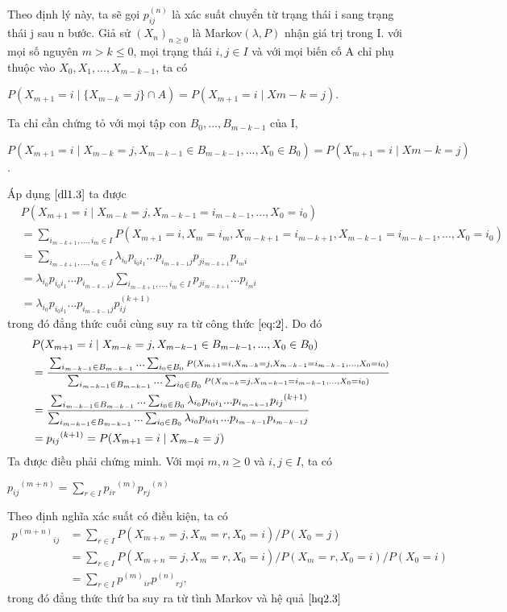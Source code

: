 Theo định lý này, ta sẽ gọi $p_{ij}^{(n)}$ là xác suất chuyển từ trạng thái i sang trạng thái j sau n bước.
\hdl
\hq\label{hq2.3}
Giả sử $(X_n)_{n \geq 0}$ là Markov$(\lambda, P)$ nhận giá trị trong I. với mọi số nguyên $m > k \leq 0$, mọi trạng thái $i, j \in I$ và với mọi biến cố A chỉ phụ thuộc vào $X_0, X_1,...,X_{m-k-1}$, ta có
\begin{center}
$P(X_{m+1}=i \mid \{X_{m-k}=j\}\cap A) = P(X_{m+1}=i \mid X{m-k}=j)$.
\end{center}
\hhq
\cm
Ta chỉ cần chứng tỏ với mọi tập con $B_0,...,B_{m-k-1}$ của I,
\begin{center}
$P(X_{m+1}=i \mid X_{m-k}=j, X_{m-k-1} \in B_{m-k-1}, ...,X_0 \in B_0) = P(X_{m+1}=i \mid X{m-k}=j)$.
\end{center}
Áp dụng $\eqref{dl1.3}$ ta được
\begin{align*} 
&P(X_{m+1}=i \mid X_{m-k}=j, X_{m-k-1}=i_{m-k-1}, ...,X_0 =i_0)\\
&= \sum_{i_{m-k+1},...,i_m \in I}{\scriptstyle P(X_{m+1}=i, X_m=i_m, X_{m-k+1}= i_{m-k+1}, X_{m-k-1}= i_{m-k-1},...,X_0=i_0)}\\
&=\sum_{i_{m-k+1},...,i_m \in I}{\lambda_{i_0}p_{i_0 i_1}...p_{i_{m-k-1}j}p_{ji_{m-k+1}}p_{i_m i}}\\
&=\lambda_{i_0}p_{i_0 i_1}...p_{i_{m-k-1}j} \sum_{i_{m-k+1},...,i_m \in I}{p_{ji_{m-k+1}}...p_{i_m i}}\\
&= \lambda_{i_0}p_{i_0 i_1}...p_{i_{m-k-1}j}{p_{ij}^{(k+1)}}
\end{align*}
trong đó đẳng thức cuối cùng suy ra từ công thức $\eqref{eq:2}$. Do đó
\begin{align*}
&P(X_{m+1}=i \mid X_{m-k}=j, X_{m-k-1} \in B_{m-k-1}, ...,X_0 \in B_0)\\ 
&=\cfrac{\sum_{i_{m-k-1}\in B_{m-k-1}}{...\sum_{i_0 \in B_0}{\scriptstyle P(X_{m+1}=i, X_{m-k}=j, X_{m-k-1}=i_{m-k-1},...,X_0 = i_0)}}}{\sum_{i_{m-k-1}\in B_{m-k-1}}{...\sum_{i_0 \in B_0}{\scriptstyle P(X_{m-k}=j, X_{m-k-1}=i_{m-k-1},...,X_0 = i_0)}}}\\
&=\cfrac{\sum_{i_{m-k-1}\in B_{m-k-1}}{...\sum_{i_0 \in B_0}{\lambda_{i_0}p_{i_0 i_1}...p_{i_{m-k-1}}{p_{ij}}^{(k+1)}}}}{\sum_{i_{m-k-1}\in B_{m-k-1}}{...\sum_{i_0 \in B_0}{\lambda_{i_0}p_{i_0 i_1}...p_{i_{m-k-1}}{p_{i_{m-k-1}j}}}}}\\
& = {p_{ij}}^{(k+1)}=P(X_{m+1}=i \mid X_{m-k}=j)
\end{align*}
Ta được điều phải chứng minh.
Với mọi $m,n \geq 0$ và $i, j \in I$, ta có
\begin{center}
${p_{ij}}^{(m+n)} = \sum_{r \in I}{{p_{ir}}^{(m)}{p_{rj}}^{(n)}}$
\end{center}
\hhq
\cm
Theo định nghĩa xác suất có điều kiện, ta có
\begin{align*}
{p^{(m+n)}}_{ij}& = \sum_{r \in I}{P(X_{m+n} = j, X_m = r, X_0=i)/P(X_0=j)}\\ 
& = \sum_{r \in I}{P(X_{m+n} = j, X_m = r, X_0=i)/P(X_m=r, X_0=i)/P(X_0=i)}\\
&=\sum_{r \in I}{{p^{(m)}}_{ir}{p^{(n)}}_{rj}},
\end{align*}
trong đó đẳng thức thứ ba suy ra từ tình Markov và hệ quả $\eqref{hq2.3}$
